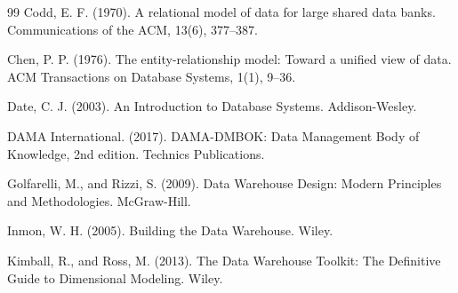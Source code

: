 \documentclass[UTF8,fontset=fandol,openany,zihao=-4]{ctexbook}
\begin{document}
\begin{thebibliography}{99}
Codd, E. F. (1970).
\newblock A relational model of data for large shared data banks.
\newblock Communications of the ACM, 13(6), 377--387.

Chen, P. P. (1976).
\newblock The entity-relationship model: Toward a unified view of data.
\newblock ACM Transactions on Database Systems, 1(1), 9--36.

Date, C. J. (2003).
\newblock An Introduction to Database Systems.
\newblock Addison-Wesley.

DAMA International. (2017).
\newblock DAMA-DMBOK: Data Management Body of Knowledge, 2nd edition.
\newblock Technics Publications.

Golfarelli, M., and Rizzi, S. (2009).
\newblock Data Warehouse Design: Modern Principles and Methodologies.
\newblock McGraw-Hill.

Inmon, W. H. (2005).
\newblock Building the Data Warehouse.
\newblock Wiley.

Kimball, R., and Ross, M. (2013).
\newblock The Data Warehouse Toolkit: The Definitive Guide to Dimensional Modeling.
\newblock Wiley.
\end{thebibliography}
\end{document}
